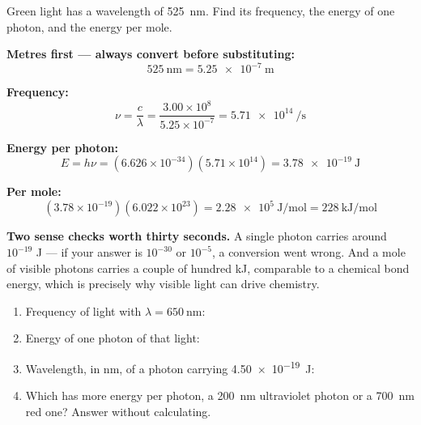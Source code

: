 \documentclass{apchem-worksheet}
\begin{document}
\begin{workedexample}
Green light has a wavelength of \SI{525}{\nano\meter}. Find its
frequency, the energy of one photon, and the energy per mole.

\textbf{Metres first --- always convert before substituting:}
\[ 525~\text{nm} = \SI{5.25e-7}{\meter} \]

\textbf{Frequency:}
\[ \nu = \frac{c}{\lambda} = \frac{3.00\times10^{8}}{5.25\times10^{-7}}
   = \SI{5.71e14}{\per\second} \]

\textbf{Energy per photon:}
\[ E = h\nu = (6.626\times10^{-34})(5.71\times10^{14})
   = \SI{3.78e-19}{\joule} \]

\textbf{Per mole:}
\[ (3.78\times10^{-19})(6.022\times10^{23})
   = \SI{2.28e5}{\joule\per\mole} = \SI{228}{\kilo\joule\per\mole} \]

\textbf{Two sense checks worth thirty seconds.} A single photon carries
around $10^{-19}$ J --- if your answer is $10^{-30}$ or $10^{-5}$, a
conversion went wrong. And a mole of visible photons carries a couple of
hundred kJ, comparable to a chemical bond energy, which is precisely why
visible light can drive chemistry.
\end{workedexample}

\begin{yourturn}
\begin{enumerate}[leftmargin=*,itemsep=0.5em]
  \item Frequency of light with $\lambda = \SI{650}{\nano\meter}$:
        \workspace[1.6cm]
  \item Energy of one photon of that light: \workspace[1.6cm]
  \item Wavelength, in nm, of a photon carrying
        \SI{4.50e-19}{\joule}: \workspace[1.8cm]
  \item Which has more energy per photon, a \SI{200}{\nano\meter}
        ultraviolet photon or a \SI{700}{\nano\meter} red one? Answer
        without calculating. \workspace[1.4cm]
\end{enumerate}
\end{yourturn}
\end{document}
